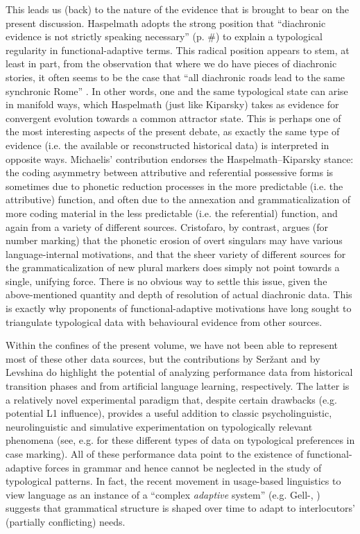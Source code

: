 \documentclass[output=paper]{langsci/langscibook}
\begin{document}
This leads us (back) to the nature of the evidence that is brought to bear on the present discussion. Haspelmath adopts the strong position that “diachronic evidence is not strictly speaking necessary” (p. \#) to explain a typological regularity in functional-adaptive terms. This radical position appears to stem, at least in part, from the observation that where we do have pieces of diachronic stories, it often seems to be the case that “all diachronic roads lead to the same synchronic Rome” \citep[38]{Kiparsky2008}. In other words, one and the same typological state can arise in manifold ways, which Haspelmath (just like Kiparsky) takes as evidence for convergent evolution towards a common attractor state. This is perhaps one of the most interesting aspects of the present debate, as exactly the same type of evidence (i.e. the available or reconstructed historical data) is interpreted in opposite ways. Michaelis’ contribution endorses the Haspelmath–Kiparsky stance: the coding asymmetry between attributive and referential possessive forms is sometimes due to phonetic reduction processes in the more predictable (i.e. the attributive) function, and often due to the annexation and grammaticalization of more coding material in the less predictable (i.e. the referential) function, and again from a variety of different sources. Cristofaro, by contrast, argues (for number marking) that the phonetic erosion of overt singulars may have various language-internal motivations, and that the sheer variety of different sources for the grammaticalization of new plural markers does simply not point towards a single, unifying force. There is no obvious way to settle this issue, given the above-mentioned quantity and depth of resolution of actual diachronic data. This is exactly why proponents of functional-adaptive motivations have long sought to triangulate typological data with behavioural evidence from other sources.

Within the confines of the present volume, we have not been able to represent most of these other data sources, but the contributions by Seržant and by Levshina do highlight the potential of analyzing performance data from historical transition phases and from artificial language learning, respectively. The latter is a relatively novel experimental paradigm that, despite certain drawbacks (e.g. potential L1 influence), provides a useful addition to classic psycholinguistic, neurolinguistic and simulative experimentation on typologically relevant phenomena (see, e.g. \citealt{KurumadaJaeger2015,BickelEtAl2015,Lestrade2018} for these different types of data on typological preferences in case marking). All of these performance data point to the existence of functional-adaptive forces in grammar and hence cannot be neglected in the study of typological patterns. In fact, the recent movement in usage-based linguistics to view language as an instance of a “complex \textit{adaptive} system” (e.g. Gell-\citealt{Mann1992}, \citealt{BecknerEtAl2009}) suggests that grammatical structure is shaped over time to adapt to interlocutors’ (partially conflicting) needs. 
\end{document}
